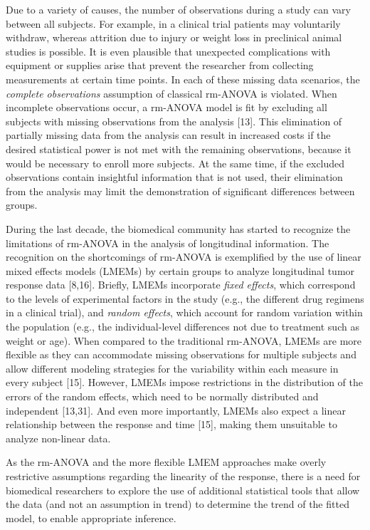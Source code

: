\documentclass[
]{article}
\begin{document}
Due to a variety of causes, the number of observations during a study can vary between all subjects. For example, in a clinical trial patients may voluntarily withdraw, whereas attrition due to injury or weight loss in preclinical animal studies is possible. It is even plausible that unexpected complications with equipment or supplies arise that prevent the researcher from collecting measurements at certain time points. In each of these missing data scenarios, the \emph{complete observations} assumption of classical rm-ANOVA is violated. When incomplete observations occur, a rm-ANOVA model is fit by excluding all subjects with missing observations from the analysis {[}13{]}. This elimination of partially missing data from the analysis can result in increased costs if the desired statistical power is not met with the remaining observations, because it would be necessary to enroll more subjects. At the same time, if the excluded observations contain insightful information that is not used, their elimination from the analysis may limit the demonstration of significant differences between groups.

During the last decade, the biomedical community has started to recognize the limitations of rm-ANOVA in the analysis of longitudinal information. The recognition on the shortcomings of rm-ANOVA is exemplified by the use of linear mixed effects models (LMEMs) by certain groups to analyze longitudinal tumor response data {[}8,16{]}. Briefly, LMEMs incorporate \emph{fixed effects}, which correspond to the levels of experimental factors in the study (e.g., the different drug regimens in a clinical trial), and \emph{random effects}, which account for random variation within the population (e.g., the individual-level differences not due to treatment such as weight or age). When compared to the traditional rm-ANOVA, LMEMs are more flexible as they can accommodate missing observations for multiple subjects and allow different modeling strategies for the variability within each measure in every subject {[}15{]}. However, LMEMs impose restrictions in the distribution of the errors of the random effects, which need to be normally distributed and independent {[}13,31{]}. And even more importantly, LMEMs also expect a linear relationship between the response and time {[}15{]}, making them unsuitable to analyze non-linear data.

As the rm-ANOVA and the more flexible LMEM approaches make overly restrictive assumptions regarding the linearity of the response, there is a need for biomedical researchers to explore the use of additional statistical tools that allow the data (and not an assumption in trend) to determine the trend of the fitted model, to enable appropriate inference.
\end{document}
